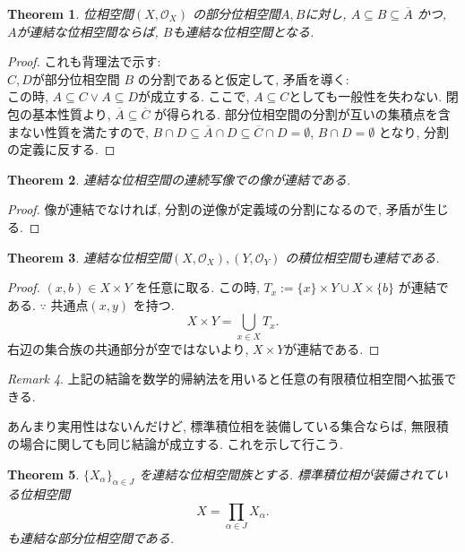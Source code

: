 \documentclass[lualatex]{ltjsbook}
\newcommand{\cl}[1]{\overline{ #1}  }
\newtheorem{theorem}{Theorem}[chapter]
\theoremstyle{remark}
\newtheorem{remark}[theorem]{Remark}
\theoremstyle{plain}
\begin{document}
\begin{theorem}
	位相空間$\left( X ,  \mathcal{O}_X \right) $ の部分位相空間$A, B$に対し,  $A \subseteq B \subseteq \cl{A} $ かつ,  $A$が連結な位相空間ならば,   $B$も連結な位相空間となる.
\end{theorem}

\begin{proof}
	これも背理法で示す: \\
	$C, D$が部分位相空間 $B$ の分割であると仮定して,  矛盾を導く:\\
	この時,   $A \subseteq C \lor A \subseteq D$が成立する. 
	ここで,  $A \subseteq C$としても一般性を失わない.
	閉包の基本性質より,  $\cl{A} \subseteq \cl{C}$ が得られる. 
	部分位相空間の分割が互いの集積点を含まない性質を満たすので,  
	$B \cap D \subseteq \cl{A} \cap D \subseteq \cl{C} \cap D = \emptyset$,  
	$B \cap D = \emptyset$ となり,  分割の定義に反する.
\end{proof}

\begin{theorem}
	連結な位相空間の連続写像での像が連結である.
\end{theorem}

\begin{proof}
	像が連結でなければ,  分割の逆像が定義域の分割になるので,  矛盾が生じる.
\end{proof}

\begin{theorem}
	連結な位相空間$\left( X,  \mathcal{O}_X \right) ,  \left( Y,  \mathcal{O}_Y \right) $ の積位相空間も連結である.
\end{theorem}

\begin{proof}
	$(x, b) \in X \times Y $ を任意に取る. この時, 
	$T_{x} := \{x\} \times Y \cup X \times \{b\}  $ が連結である. $\because$ 共通点$\left( x, y \right) $ を持つ.\\
	 \[
	X \times Y = \bigcup_{x \in X}T_x 
	.\] 
	右辺の集合族の共通部分が空ではないより,  $X \times Y$が連結である.
\end{proof}

\begin{remark}
	上記の結論を数学的帰納法を用いると任意の有限積位相空間へ拡張できる.
\end{remark}

あんまり実用性はないんだけど,  標準積位相を装備している集合ならば,  無限積の場合に関しても同じ結論が成立する. これを示して行こう.

\begin{theorem}
	$\{X_{\alpha}\} _{\alpha \in J}$ を連結な位相空間族とする. 
	標準積位相が装備されている位相空間
	\[
	X = \prod_{\alpha \in J} X _{\alpha}  
	.\] 
	も連結な部分位相空間である.
\end{theorem}
\end{document}
